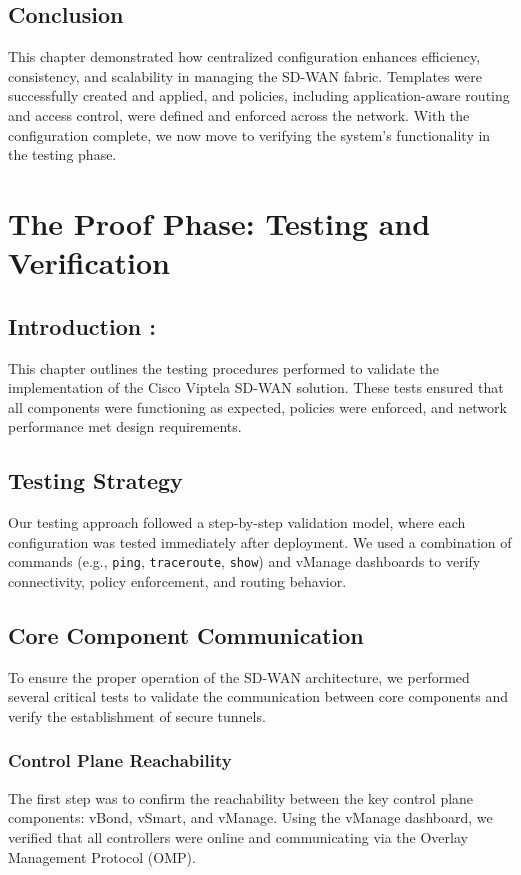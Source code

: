 \documentclass[12pt,english]{report}
\begin{document}
\section{Conclusion}
This chapter demonstrated how centralized configuration enhances efficiency, consistency, and scalability in managing the SD-WAN fabric. Templates were successfully created and applied, and policies, including application-aware routing and access control, were defined and enforced across the network. With the configuration complete, we now move to verifying the system's functionality in the testing phase.

\chapter{The Proof Phase: Testing and Verification}
\section{Introduction :}
This chapter outlines the testing procedures performed to validate the implementation of the Cisco Viptela SD-WAN solution. These tests ensured that all components were functioning as expected, policies were enforced, and network performance met design requirements.
\section{Testing Strategy}
Our testing approach followed a step-by-step validation model, where each configuration was tested immediately after deployment. We used a combination of commands (e.g., \texttt{ping}, \texttt{traceroute}, \texttt{show}) and vManage dashboards to verify connectivity, policy enforcement, and routing behavior.

\section{Core Component Communication}

To ensure the proper operation of the SD-WAN architecture, we performed several critical tests to validate the communication between core components and verify the establishment of secure tunnels.

\subsection{Control Plane Reachability}

The first step was to confirm the reachability between the key control plane components: vBond, vSmart, and vManage. Using the vManage dashboard, we verified that all controllers were online and communicating via the Overlay Management Protocol (OMP).
\end{document}

